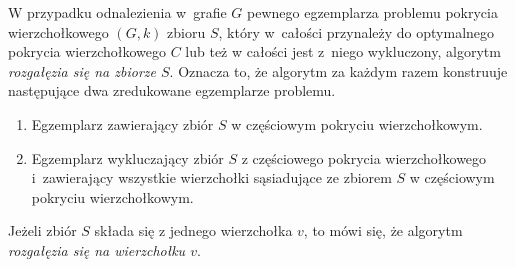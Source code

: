 {\begin{bproof}
  \end{bproof}
  \begin{definition}
    W przypadku odnalezienia w~grafie $G$ pewnego egzemplarza problemu pokrycia wierzchołkowego $(G, k)$ zbioru $S$, który w~całości przynależy do optymalnego pokrycia wierzchołkowego $C$ lub też w całości jest z~niego wykluczony, algorytm \emph{rozgałęzia się na zbiorze $S$}.
    Oznacza to, że algorytm za każdym razem konstruuje następujące dwa zredukowane egzemplarze problemu.
    \begin{enumerate}
      \item Egzemplarz zawierający zbiór $S$ w częściowym pokryciu wierzchołkowym.
      \item Egzemplarz wykluczający zbiór $S$ z częściowego pokrycia wierzchołkowego i~zawierający wszystkie wierzchołki sąsiadujące ze zbiorem $S$ w częściowym pokryciu wierzchołkowym.
    \end{enumerate}
    Jeżeli zbiór $S$ składa się z jednego wierzchołka $v$, to mówi się, że algorytm \emph{rozgałęzia się na wierzchołku $v$}.
  \end{definition}
}
